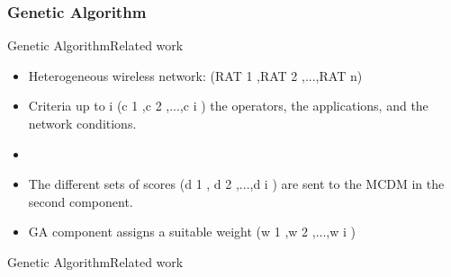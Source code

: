 \subsubsection{Genetic Algorithm}

\begin{frame}{Genetic Algorithm}{Related work \cite{alkhawlani_access_2008a}}

\begin{itemize}
	\item Heterogeneous wireless network: (RAT 1 ,RAT 2 ,...,RAT n)
	\item Criteria up to i (c 1 ,c 2 ,...,c i ) the operators, the applications, and the network conditions.
	\item 
	\item The different sets of scores (d 1 , d 2 ,...,d i ) are sent to the MCDM in the second component.
	\item GA component assigns a suitable weight (w 1 ,w 2 ,...,w i )
\end{itemize}

\end{frame}

\begin{frame}{Genetic Algorithm}{Related work}

\end{frame}



